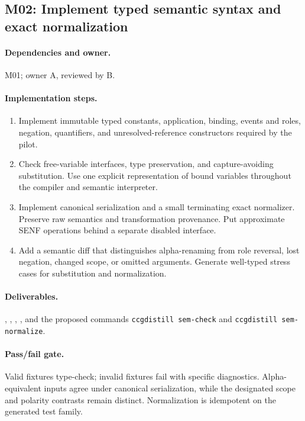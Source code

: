 \documentclass[11pt,a4paper]{article}
\begin{document}
\subsection{M02: Implement typed semantic syntax and exact normalization}

\paragraph{Dependencies and owner.} M01; owner A, reviewed by B.

\paragraph{Implementation steps.}
\begin{enumerate}
\item Implement immutable typed constants, application, binding, events and roles, negation, quantifiers, and unresolved-reference constructors required by the pilot.
\item Check free-variable interfaces, type preservation, and capture-avoiding substitution. Use one explicit representation of bound variables throughout the compiler and semantic interpreter.
\item Implement canonical serialization and a small terminating exact normalizer. Preserve raw semantics and transformation provenance. Put approximate SENF operations behind a separate disabled interface.
\item Add a semantic diff that distinguishes alpha-renaming from role reversal, lost negation, changed scope, or omitted arguments. Generate well-typed stress cases for substitution and normalization.
\end{enumerate}

\paragraph{Deliverables.} , , , , and the proposed commands \texttt{ccgdistill sem-check} and \texttt{ccgdistill sem-normalize}.

\paragraph{Pass/fail gate.} Valid fixtures type-check; invalid fixtures fail with specific diagnostics. Alpha-equivalent inputs agree under canonical serialization, while the designated scope and polarity contrasts remain distinct. Normalization is idempotent on the generated test family.
\end{document}
